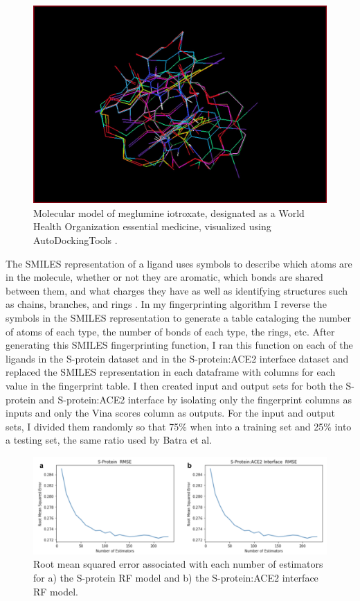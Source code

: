 \documentclass[11pt]{article}
\begin{document}
     \begin{figure}
     \centering
     \includegraphics[width=120mm]{lig}
     \caption{Molecular model of meglumine iotroxate, designated as a World Health Organization essential medicine, visualized using AutoDockingTools \cite{autodock}.}
     \label{fig:lig}
   \end{figure} 
  
  The SMILES representation of a ligand uses symbols to describe which atoms are in the molecule, whether or not they are aromatic, which bonds are shared between them, and what charges they have as well as identifying structures such as chains, branches, and rings \cite{smiles}. In my fingerprinting algorithm I reverse the symbols in the SMILES representation to generate a table cataloging the number of atoms of each type, the number of bonds of each type, the rings, etc. After generating this SMILES fingerprinting function, I ran this function on each of the ligands in the S-protein dataset and in the S-protein:ACE2 interface dataset and replaced the SMILES representation in each dataframe with columns for each value in the fingerprint table. I then created input and output sets for both the S-protein and S-protein:ACE2 interface by isolating only the fingerprint columns as inputs and only the Vina scores column as outputs. For the input and output sets, I divided them randomly so that 75\% when into a training set and 25\% into a testing set, the same ratio used by Batra et al. \cite{batra}
  
   \begin{figure}
     \centering
     \includegraphics[width=120mm]{rferror}
     \caption{Root mean squared error associated with each number of estimators for a) the S-protein RF model and b) the S-protein:ACE2 interface RF model.}
     \label{fig:rferror}
   \end{figure} 
  
\end{document}
